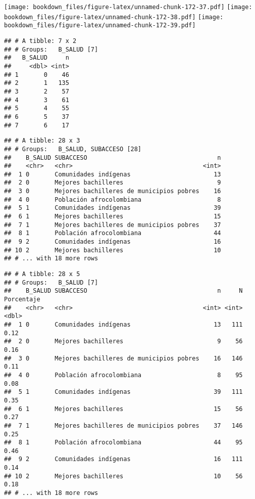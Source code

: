 \documentclass[]{article}
\theoremstyle{definition}
\theoremstyle{definition}
\theoremstyle{definition}
\theoremstyle{remark}
\begin{document}
\texttt{[image: bookdown\_files/figure-latex/unnamed-chunk-172-37.pdf]}
\texttt{[image: bookdown\_files/figure-latex/unnamed-chunk-172-38.pdf]}
\texttt{[image: bookdown\_files/figure-latex/unnamed-chunk-172-39.pdf]}

\begin{verbatim}
## # A tibble: 7 x 2
## # Groups:   B_SALUD [7]
##   B_SALUD     n
##     <dbl> <int>
## 1       0    46
## 2       1   135
## 3       2    57
## 4       3    61
## 5       4    55
## 6       5    37
## 7       6    17
\end{verbatim}

\begin{verbatim}
## # A tibble: 28 x 3
## # Groups:   B_SALUD, SUBACCESO [28]
##    B_SALUD SUBACCESO                                    n
##    <chr>   <chr>                                    <int>
##  1 0       Comunidades indígenas                       13
##  2 0       Mejores bachilleres                          9
##  3 0       Mejores bachilleres de municipios pobres    16
##  4 0       Población afrocolombiana                     8
##  5 1       Comunidades indígenas                       39
##  6 1       Mejores bachilleres                         15
##  7 1       Mejores bachilleres de municipios pobres    37
##  8 1       Población afrocolombiana                    44
##  9 2       Comunidades indígenas                       16
## 10 2       Mejores bachilleres                         10
## # ... with 18 more rows
\end{verbatim}

\begin{verbatim}
## # A tibble: 28 x 5
## # Groups:   B_SALUD [7]
##    B_SALUD SUBACCESO                                    n     N Porcentaje
##    <chr>   <chr>                                    <int> <int>      <dbl>
##  1 0       Comunidades indígenas                       13   111       0.12
##  2 0       Mejores bachilleres                          9    56       0.16
##  3 0       Mejores bachilleres de municipios pobres    16   146       0.11
##  4 0       Población afrocolombiana                     8    95       0.08
##  5 1       Comunidades indígenas                       39   111       0.35
##  6 1       Mejores bachilleres                         15    56       0.27
##  7 1       Mejores bachilleres de municipios pobres    37   146       0.25
##  8 1       Población afrocolombiana                    44    95       0.46
##  9 2       Comunidades indígenas                       16   111       0.14
## 10 2       Mejores bachilleres                         10    56       0.18
## # ... with 18 more rows
\end{verbatim}
\end{document}
